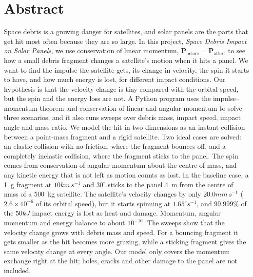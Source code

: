 \newpage
\section*{Abstract}

Space debris is a growing danger for satellites, and solar panels are the
parts that get hit most often because they are so large. In this project,
\textit{Space Debris Impact on Solar Panels}, we use conservation of linear
momentum, $\mathbf{P}_{\mathrm{before}} = \mathbf{P}_{\mathrm{after}}$, to see
how a small debris fragment changes a satellite's motion when it hits a
panel. We want to find the impulse the satellite gets, its change in
velocity, the spin it starts to have, and how much energy is lost, for
different impact conditions. Our hypothesis is that the velocity change is
tiny compared with the orbital speed, but the spin and the energy loss are
not. A Python program uses the impulse--momentum theorem and conservation of
linear and angular momentum to solve three scenarios, and it also runs
sweeps over debris mass, impact speed, impact angle and mass ratio. We model
the hit in two dimensions as an instant collision between a point-mass
fragment and a rigid satellite. Two ideal cases are solved: an elastic
collision with no friction, where the fragment bounces off, and a completely
inelastic collision, where the fragment sticks to the panel. The spin comes
from conservation of angular momentum about the centre of mass, and any
kinetic energy that is not left as motion counts as lost. In the baseline
case, a 1~g fragment at $10\unit{km\,s^{-1}}$ and $30^\circ$ sticks to the
panel 4~m from the centre of mass of a 500~kg satellite. The satellite's
velocity changes by only $20.0\unit{mm\,s^{-1}}$ ($2.6\times10^{-6}$ of its
orbital speed), but it starts spinning at $1.65^\circ\unit{s^{-1}}$, and
$99.999\%$ of the $50\unit{kJ}$ impact energy is lost as heat and damage.
Momentum, angular momentum and energy balance to about $10^{-16}$. The sweeps
show that the velocity change grows with debris mass and speed. For a
bouncing fragment it gets smaller as the hit becomes more grazing, while a
sticking fragment gives the same velocity change at every angle. Our model
only covers the momentum exchange right at the hit; holes, cracks and other
damage to the panel are not included.
